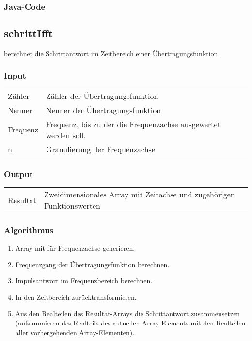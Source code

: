 \subsubsection*{Java-Code}



\subsection{schrittIfft}

   berechnet  die   Schrittantwort   im  Zeitbereich   einer
\"Ubertragungsfunktion. 

\subsubsection*{Input}

\begin{tabular}{p{40mm}l}
    Z\"ahler & Z\"ahler der \"Ubertragungsfunktion                             \\
    Nenner   & Nenner der \"Ubertragungsfunktion                               \\
    Frequenz & Frequenz, bis zu der die Frequenzachse ausgewertet werden soll. \\
    n        & Granulierung der Frequenzachse
\end{tabular}

\subsubsection*{Output}
\begin{tabular}{p{40mm}l}
    Resultat & \parbox[t][4em][s]{0.7\textwidth}{Zweidimensionales Array mit Zeitachse und zugeh\"origen Funktionswerten}
\end{tabular}

\subsubsection*{Algorithmus}
\begin{enumerate}
    \item
        Array mit f\"ur Frequenzachse generieren.
    \item
        Frequenzgang der \"Ubertragungsfunktion berechnen.
    \item
        Impulsantwort im Frequenzbereich berechnen.
    \item
        In den Zeitbereich zur\"ucktransformieren.
    \item
        Aus   den   Realteilen    des   Resultat-Arrays   die   Schrittantwort
        zusammensetzen    (aufsummieren    des   Realteils    des    aktuellen
        Array-Elements    mit    den     Realteilen    aller    vorhergehenden
        Array-Elementen).
\end{enumerate}

